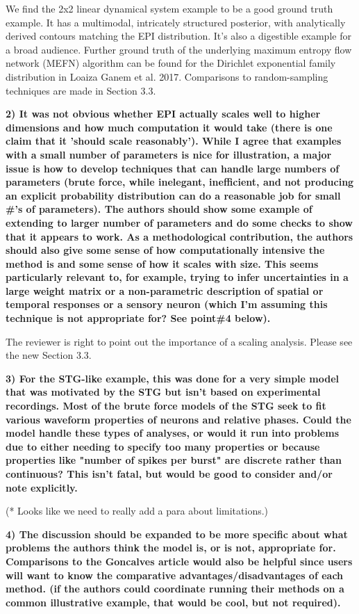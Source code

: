 \documentclass[11pt,a4paper]{article}
\begin{document}
We find the 2x2 linear dynamical system example to be a good ground truth example.  It has a multimodal, intricately structured posterior, with analytically derived contours matching the EPI distribution.  It’s also a digestible example for a broad audience.  Further ground truth of the underlying maximum entropy flow network (MEFN) algorithm can be found for the Dirichlet exponential family distribution in Loaiza Ganem et al. 2017.  Comparisons to random-sampling techniques are made in Section 3.3.

\textbf{2) It was not obvious whether EPI actually scales well to higher dimensions and how much computation it would take (there is one claim that it 'should scale reasonably'). While I agree that examples with a small number of parameters is nice for illustration, a major issue is how to develop techniques that can handle large numbers of parameters (brute force, while inelegant, inefficient, and not producing an explicit probability distribution can do a reasonable job for small \#'s of parameters). The authors should show some example of extending to larger number of parameters and do some checks to show that it appears to work. As a methodological contribution, the authors should also give some sense of how computationally intensive the method is and some sense of how it scales with size. This seems particularly relevant to, for example, trying to infer uncertainties in a large weight matrix or a non-parametric description of spatial or temporal responses or a sensory neuron (which I'm assuming this technique is not appropriate for? See point\#4 below). }

The reviewer is right to point out the importance of a scaling analysis.  Please see the new Section 3.3. 

\textbf{3) For the STG-like example, this was done for a very simple model that was motivated by the STG but isn't based on experimental recordings. Most of the brute force models of the STG seek to fit various waveform properties of neurons and relative phases. Could the model handle these types of analyses, or would it run into problems due to either needing to specify too many properties or because properties like "number of spikes per burst" are discrete rather than continuous? This isn't fatal, but would be good to consider and/or note explicitly. }

(* Looks like we need to really add a para about limitations.)

\textbf{4) The discussion should be expanded to be more specific about what problems the authors think the model is, or is not, appropriate for. Comparisons to the Goncalves article would also be helpful since users will want to know the comparative advantages/disadvantages of each method. (if the authors could coordinate running their methods on a common illustrative example, that would be cool, but not required). }
\end{document}
